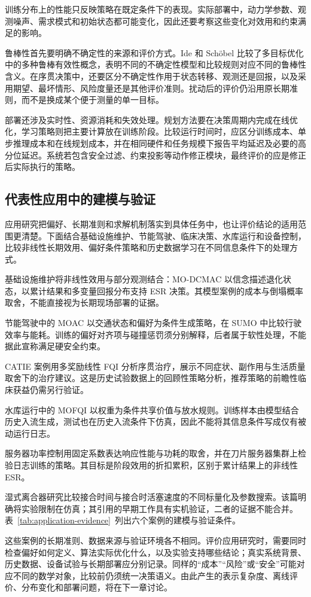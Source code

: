 训练分布上的性能只反映策略在既定条件下的表现。实际部署中，动力学参数、观测噪声、需求模式和初始状态都可能变化，因此还要考察这些变化对效用和约束满足的影响。

鲁棒性首先要明确不确定性的来源和评价方式。Ide 和 Schöbel 比较了多目标优化中的多种鲁棒有效性概念，表明不同的不确定性模型和比较规则对应不同的鲁棒性含义\cite{ide2016}。在序贯决策中，还要区分不确定性作用于状态转移、观测还是回报，以及采用期望、最坏情形、风险度量还是其他评价准则。扰动后的评价仍沿用原长期准则，而不是换成某个便于测量的单一目标。

部署还涉及实时性、资源消耗和失效处理。规划方法要在决策周期内完成在线优化，学习策略则把主要计算放在训练阶段。比较运行时间时，应区分训练成本、单步推理成本和在线规划成本，并在相同硬件和任务规模下报告平均延迟及必要的高分位延迟。系统若包含安全过滤、约束投影等动作修正模块，最终评价的应是修正后实际执行的策略。

\subsection{代表性应用中的建模与验证}\label{sec:eval-apps}

应用研究把偏好、长期准则和求解机制落实到具体任务中，也让评价结论的适用范围更清楚。下面结合基础设施维护、节能驾驶、临床决策、水库运行和设备控制，比较非线性长期效用、偏好条件策略和历史数据学习在不同信息条件下的处理方式。

基础设施维护将非线性效用与部分观测结合：MO-DCMAC 以信念描述退化状态，以累计结果和多变量回报分布支持 ESR 决策\cite{remmerden2025}。其模型案例的成本与倒塌概率取舍，不能直接视为长期现场部署的证据。

节能驾驶中的 MOAC 以交通状态和偏好为条件生成策略，在 SUMO 中比较行驶效率与能耗\cite{he2023}。训练的偏好对齐项与碰撞惩罚须分别解释，后者属于软性处理，不能据此宣称满足硬安全约束。

CATIE 案例用多奖励线性 FQI 分析序贯治疗，展示不同症状、副作用与生活质量取舍下的治疗建议\cite{lizotte2012}。这是历史试验数据上的回顾性策略分析，推荐策略的前瞻性临床获益仍需另行验证。

水库运行中的 MOFQI 以权重为条件共享价值与放水规则\cite{castelletti2013water}。训练样本由模型结合历史入流生成，测试也在历史入流条件下仿真，因此不能将其信息条件写成仅有被动运行日志。

服务器功率控制用固定系数表达响应性能与功耗的取舍，并在刀片服务器集群上检验日志训练的策略\cite{tesauro2007power}。其目标是阶段效用的折扣累积，区别于累计结果上的非线性 ESR。

湿式离合器研究比较接合时间与接合时活塞速度的不同标量化及参数搜索\cite{brys2013clutch}。该篇明确将实验限制在仿真；其引用的早期工作具有实机验证，二者的证据不能合并。表~\ref{tab:application-evidence}~列出六个案例的建模与验证条件。



这些案例的长期准则、数据来源与验证环境各不相同。评价应用研究时，需要同时检查偏好如何定义、算法实际优化什么，以及实验支持哪些结论；真实系统背景、历史数据、设备试验与长期部署应分别记录。同样的“成本”“风险”或“安全”可能对应不同的数学对象，比较前仍须统一决策语义。由此产生的表示复杂度、离线评价、分布变化和部署问题，将在下一章讨论。
